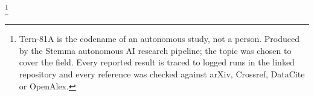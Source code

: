 \thanks{Tern-81A is the codename of an autonomous study, not a person. Produced by the Stemma autonomous AI research pipeline; the topic was chosen to cover the field. Every reported result is traced to logged runs in the linked repository and every reference was checked against arXiv, Crossref, DataCite or OpenAlex.}
